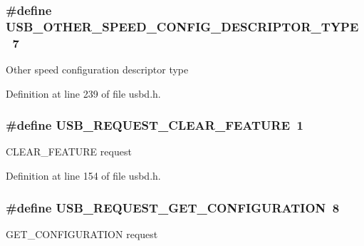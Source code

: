 \subsubsection[{\texorpdfstring{U\+S\+B\+\_\+\+O\+T\+H\+E\+R\+\_\+\+S\+P\+E\+E\+D\+\_\+\+C\+O\+N\+F\+I\+G\+\_\+\+D\+E\+S\+C\+R\+I\+P\+T\+O\+R\+\_\+\+T\+Y\+PE}{USB_OTHER_SPEED_CONFIG_DESCRIPTOR_TYPE}}]{\setlength{\rightskip}{0pt plus 5cm}\#define U\+S\+B\+\_\+\+O\+T\+H\+E\+R\+\_\+\+S\+P\+E\+E\+D\+\_\+\+C\+O\+N\+F\+I\+G\+\_\+\+D\+E\+S\+C\+R\+I\+P\+T\+O\+R\+\_\+\+T\+Y\+PE~7}\hypertarget{group__USBD__Core_ga0d886bcc28cf10d730106d7be9b661fd}{}\label{group__USBD__Core_ga0d886bcc28cf10d730106d7be9b661fd}
Other speed configuration descriptor type 

Definition at line 239 of file usbd.\+h.

\subsubsection[{\texorpdfstring{U\+S\+B\+\_\+\+R\+E\+Q\+U\+E\+S\+T\+\_\+\+C\+L\+E\+A\+R\+\_\+\+F\+E\+A\+T\+U\+RE}{USB_REQUEST_CLEAR_FEATURE}}]{\setlength{\rightskip}{0pt plus 5cm}\#define U\+S\+B\+\_\+\+R\+E\+Q\+U\+E\+S\+T\+\_\+\+C\+L\+E\+A\+R\+\_\+\+F\+E\+A\+T\+U\+RE~1}\hypertarget{group__USBD__Core_gab9fe860caa1f21c9410984a24bf57c7c}{}\label{group__USBD__Core_gab9fe860caa1f21c9410984a24bf57c7c}
C\+L\+E\+A\+R\+\_\+\+F\+E\+A\+T\+U\+RE request 

Definition at line 154 of file usbd.\+h.

\subsubsection[{\texorpdfstring{U\+S\+B\+\_\+\+R\+E\+Q\+U\+E\+S\+T\+\_\+\+G\+E\+T\+\_\+\+C\+O\+N\+F\+I\+G\+U\+R\+A\+T\+I\+ON}{USB_REQUEST_GET_CONFIGURATION}}]{\setlength{\rightskip}{0pt plus 5cm}\#define U\+S\+B\+\_\+\+R\+E\+Q\+U\+E\+S\+T\+\_\+\+G\+E\+T\+\_\+\+C\+O\+N\+F\+I\+G\+U\+R\+A\+T\+I\+ON~8}\hypertarget{group__USBD__Core_ga341ed4aff1f0d5a1a4a4f17cb606d08d}{}\label{group__USBD__Core_ga341ed4aff1f0d5a1a4a4f17cb606d08d}
G\+E\+T\+\_\+\+C\+O\+N\+F\+I\+G\+U\+R\+A\+T\+I\+ON request 

